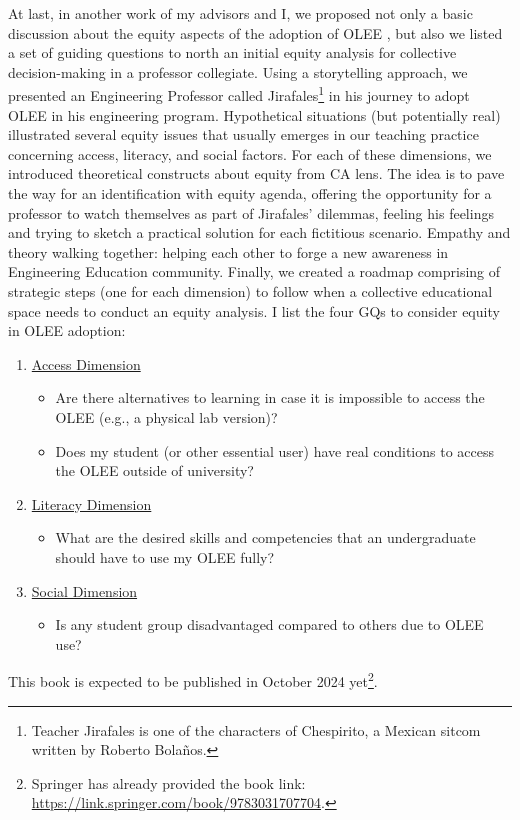 At last, in another work of my advisors and I, we proposed not only a basic discussion about the equity aspects of the adoption of \acrfull{OLEE} \cite{bispojr:2024-online-lab}, but also we listed a set of guiding questions to north an initial equity analysis for collective decision-making in a professor collegiate. Using a storytelling approach, we presented an Engineering Professor called Jirafales\footnote{Teacher Jirafales is one of the characters of Chespirito, a Mexican sitcom written by Roberto Bolaños.} in his journey to adopt \gls{OLEE} in his engineering program. Hypothetical situations (but potentially real) illustrated several equity issues that usually emerges in our teaching practice concerning access, literacy, and social factors. For each of these dimensions, we introduced theoretical constructs about equity from \gls{CA} lens. The idea is to pave the way for an identification with equity agenda, offering the opportunity for a professor to watch themselves as part of Jirafales' dilemmas, feeling his feelings and trying to sketch a practical solution for each fictitious scenario. Empathy and theory walking together: helping each other to forge a new awareness in Engineering Education community. Finally, we created a roadmap comprising of strategic steps (one for each dimension) to follow when a collective educational space needs to conduct an equity analysis. I list the four \glspl{GQ} to consider equity in \gls{OLEE} adoption:
\begin{enumerate}
    \item \underline{Access Dimension}
    \begin{itemize}
        \item[(\gls{GQ}1)] Are there alternatives to learning in case it is impossible to access the OLEE (e.g., a physical lab version)?
        \item[(\gls{GQ}2)] Does my student (or other essential user) have real conditions to access the OLEE outside of university?
    \end{itemize} 
    \item \underline{Literacy Dimension}
    \begin{itemize}
        \item[(\gls{GQ}3)] What are the desired skills and competencies that an undergraduate should have to use my OLEE fully?
    \end{itemize}
    \item \underline{Social Dimension}
    \begin{itemize}
        \item[(\gls{GQ}4)] Is any student group disadvantaged compared to others due to OLEE use?
    \end{itemize}
\end{enumerate}
This book is expected to be published in October 2024 yet\footnote{Springer has already provided the book link: \url{https://link.springer.com/book/9783031707704}.}. 




